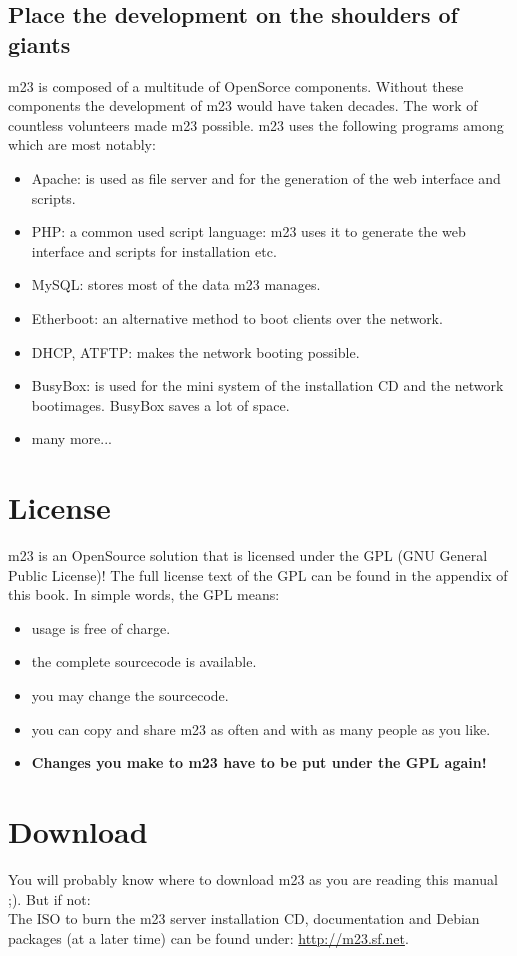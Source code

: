 \subsection{Place the development on the shoulders of giants}
m23 is composed of a multitude of OpenSorce components. Without these components the development of m23 would have taken decades. The work of countless volunteers made m23 possible. m23 uses the following programs among which are most notably:
\begin{itemize}
\item Apache: is used as file server and for the generation of the web interface and scripts.
\item PHP: a common used script language: m23 uses it to generate the web interface and scripts for installation etc.
\item MySQL: stores most of the data m23 manages.
\item Etherboot: an alternative method to boot clients over the network.
\item DHCP, ATFTP: makes the network booting possible.
\item BusyBox: is used for the mini system of the installation CD and the network bootimages. BusyBox saves a lot of space.
\item many more...
\end{itemize}


\section{License}
m23 is an OpenSource solution that is licensed under the GPL (GNU General Public License)! The full license text of the GPL can be found in the appendix of this book. In simple words, the GPL means:
\begin{itemize}
\item usage is free of charge.
\item the complete sourcecode is available.
\item you may change the sourcecode.
\item you can copy and share m23 as often and with as many people as you like.
\item \textbf{Changes you make to m23 have to be put under the GPL again!}
\end{itemize}

\section{Download}
You will probably know where to download m23 as you are reading this manual ;). But if not:\\
The ISO to burn the m23 server installation CD, documentation and Debian packages (at a later time) can be found under: \underline{http://m23.sf.net}.



